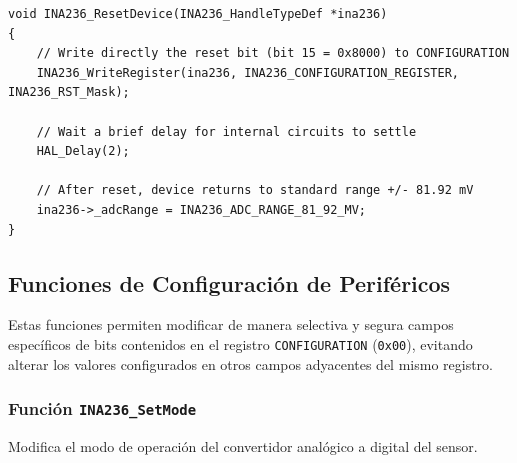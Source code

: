 \documentclass[
10pt, %
a4paper, %
oneside, %
headinclude,footinclude, %
BCOR5mm, %
]{scrartcl}
\begin{document}
\begin{lstlisting}[style=CMakeStyle]
void INA236_ResetDevice(INA236_HandleTypeDef *ina236)
{
    // Write directly the reset bit (bit 15 = 0x8000) to CONFIGURATION
    INA236_WriteRegister(ina236, INA236_CONFIGURATION_REGISTER, INA236_RST_Mask);
    
    // Wait a brief delay for internal circuits to settle
    HAL_Delay(2); 
    
    // After reset, device returns to standard range +/- 81.92 mV
    ina236->_adcRange = INA236_ADC_RANGE_81_92_MV;
}
\end{lstlisting}

\subsection{Funciones de Configuración de Periféricos}
Estas funciones permiten modificar de manera selectiva y segura campos específicos de bits contenidos en el registro \texttt{CONFIGURATION} (\texttt{0x00}), evitando alterar los valores configurados en otros campos adyacentes del mismo registro.

\subsubsection{Función \texttt{INA236\_SetMode}}
Modifica el modo de operación del convertidor analógico a digital del sensor.
\end{document}
